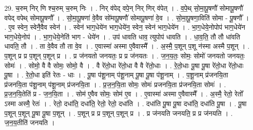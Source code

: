 \documentclass[17pt]{extarticle}
\begin{document}
29. च॒रुम् निर् णि श्च॒रुम् च॒रुम् निः । . निर् व॑पेद् वपे॒न् निर् णिर् व॑पेत् । . व॒पे॒थ् सो॒मा॒पू॒षणौ॑ सोमापू॒षणौ॑ वपेद् वपेथ् सोमापू॒षणौ᳚ । . सो॒मा॒पू॒षणा॑ वे॒वैव सो॑मापू॒षणौ॑ सोमापू॒षणा॑ वे॒व । . सो॒मा॒पू॒षणा॒विति॑ सोमा - पू॒षणौ᳚ । . ए॒व स्वेन॒ स्वेनै॒वैव स्वेन॑ । . स्वेन॑ भाग॒धेये॑न भाग॒धेये॑न॒ स्वेन॒ स्वेन॑ भाग॒धेये॑न । . भा॒ग॒धेये॒नोपोप॑ भाग॒धेये॑न भाग॒धेये॒नोप॑ । . भा॒ग॒धेये॒नेति॑ भाग - धेये॑न । . उप॑ धावति धाव॒ त्युपोप॑ धावति । . धा॒व॒ति॒ तौ तौ धा॑वति धावति॒ तौ । . ता वे॒वैव तौ ता वे॒व । . ए॒वास्मा॑ अस्मा ए॒वैवास्मै᳚ । . अ॒स्मै॒ प॒शून् प॒शू न॑स्मा अस्मै प॒शून् । . प॒शून् प्र प्र प॒शून् प॒शून् प्र । . प्र ज॑नयतो जनयतः॒ प्र प्र ज॑नयतः । . ज॒न॒य॒तः॒ सोमः॒ सोमो॑ जनयतो जनयतः॒ सोमः॑ । . सोमो॒ वै वै सोमः॒ सोमो॒ वै । . वै रे॑तो॒धा रे॑तो॒धा वै वै रे॑तो॒धाः । . रे॒तो॒धाः पू॒षा पू॒षा रे॑तो॒धा रे॑तो॒धाः पू॒षा । . रे॒तो॒धा इति॑ रेतः - धाः । . पू॒षा प॑शू॒नाम् प॑शू॒नाम् पू॒षा पू॒षा प॑शू॒नाम् । . प॒शू॒नाम् प्र॑जनयि॒ता प्र॑जनयि॒ता प॑शू॒नाम् प॑शू॒नाम् प्र॑जनयि॒ता । . प्र॒ज॒न॒यि॒ता सोमः॒ सोमः॑ प्रजनयि॒ता प्र॑जनयि॒ता सोमः॑ । . प्र॒ज॒न॒यि॒तेति॑ प्र - ज॒न॒यि॒ता । . सोम॑ ए॒वैव सोमः॒ सोम॑ ए॒व । . ए॒वास्मा॑ अस्मा ए॒वैवास्मै᳚ । . अ॒स्मै॒ रेतो॒ रेतो᳚ ऽस्मा अस्मै॒ रेतः॑ । . रेतो॒ दधा॑ति॒ दधा॑ति॒ रेतो॒ रेतो॒ दधा॑ति । . दधा॑ति पू॒षा पू॒षा दधा॑ति॒ दधा॑ति पू॒षा । . पू॒षा प॒शून् प॒शून् पू॒षा पू॒षा प॒शून् । . प॒शून् प्र प्र प॒शून् प॒शून् प्र । . प्र ज॑नयति जनयति॒ प्र प्र ज॑नयति । . ज॒न॒य॒तीति॑ जनयति । \newline
\end{document}
